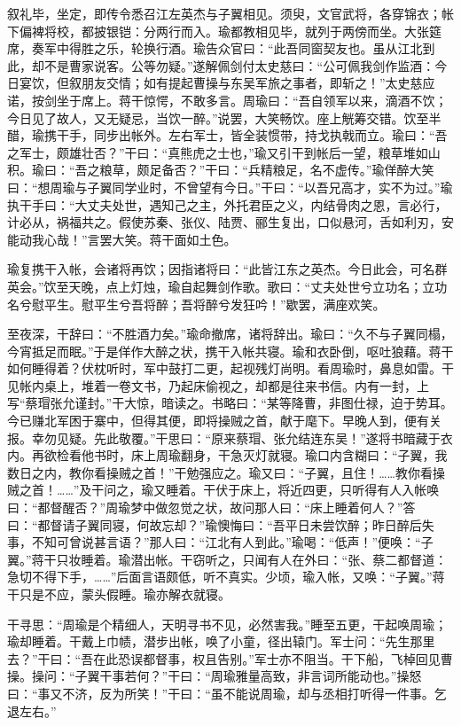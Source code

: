 叙礼毕，坐定，即传令悉召江左英杰与子翼相见。须臾，文官武将，各穿锦衣；帐下偏裨将校，都披银铠：分两行而入。瑜都教相见毕，就列于两傍而坐。大张筵席，奏军中得胜之乐，轮换行酒。瑜告众官曰：“此吾同窗契友也。虽从江北到此，却不是曹家说客。公等勿疑。”遂解佩剑付太史慈曰：“公可佩我剑作监酒：今日宴饮，但叙朋友交情；如有提起曹操与东吴军旅之事者，即斩之！”太史慈应诺，按剑坐于席上。蒋干惊愕，不敢多言。周瑜曰：“吾自领军以来，滴酒不饮；今日见了故人，又无疑忌，当饮一醉。”说罢，大笑畅饮。座上觥筹交错。饮至半醋，瑜携干手，同步出帐外。左右军士，皆全装惯带，持戈执戟而立。瑜曰：“吾之军士，颇雄壮否？”干曰：“真熊虎之士也，”瑜又引干到帐后一望，粮草堆如山积。瑜曰：“吾之粮草，颇足备否？”干曰：“兵精粮足，名不虚传。”瑜佯醉大笑曰：“想周瑜与子翼同学业时，不曾望有今日。”干曰：“以吾兄高才，实不为过。”瑜执干手曰：“大丈夫处世，遇知己之主，外托君臣之义，内结骨肉之恩，言必行，计必从，祸福共之。假使苏秦、张仪、陆贾、郦生复出，口似悬河，舌如利刃，安能动我心哉！”言罢大笑。蒋干面如土色。

瑜复携干入帐，会诸将再饮；因指诸将曰：“此皆江东之英杰。今日此会，可名群英会。”饮至天晚，点上灯烛，瑜自起舞剑作歌。歌曰：“丈夫处世兮立功名；立功名兮慰平生。慰平生兮吾将醉；吾将醉兮发狂吟！”歇罢，满座欢笑。

至夜深，干辞曰：“不胜酒力矣。”瑜命撤席，诸将辞出。瑜曰：“久不与子翼同榻，今宵抵足而眠。”于是佯作大醉之状，携干入帐共寝。瑜和衣卧倒，呕吐狼藉。蒋干如何睡得着？伏枕听时，军中鼓打二更，起视残灯尚明。看周瑜时，鼻息如雷。干见帐内桌上，堆着一卷文书，乃起床偷视之，却都是往来书信。内有一封，上写“蔡瑁张允谨封。”干大惊，暗读之。书略曰：“某等降曹，非图仕禄，迫于势耳。今已赚北军困于寨中，但得其便，即将操贼之首，献于麾下。早晚人到，便有关报。幸勿见疑。先此敬覆。”干思曰：“原来蔡瑁、张允结连东吴！”遂将书暗藏于衣内。再欲检看他书时，床上周瑜翻身，干急灭灯就寝。瑜口内含糊曰：“子翼，我数日之内，教你看操贼之首！”干勉强应之。瑜又曰：“子翼，且住！……教你看操贼之首！……”及干问之，瑜又睡着。干伏于床上，将近四更，只听得有人入帐唤曰：“都督醒否？”周瑜梦中做忽觉之状，故问那人曰：“床上睡着何人？”答曰：“都督请子翼同寝，何故忘却？”瑜懊悔曰：“吾平日未尝饮醉；昨日醉后失事，不知可曾说甚言语？”那人曰：“江北有人到此。”瑜喝：“低声！”便唤：“子翼。”蒋干只妆睡着。瑜潜出帐。干窃听之，只闻有人在外曰：“张、蔡二都督道：急切不得下手，……”后面言语颇低，听不真实。少顷，瑜入帐，又唤：“子翼。”蒋干只是不应，蒙头假睡。瑜亦解衣就寝。

干寻思：“周瑜是个精细人，天明寻书不见，必然害我。”睡至五更，干起唤周瑜；瑜却睡着。干戴上巾帻，潜步出帐，唤了小童，径出辕门。军士问：“先生那里去？”干曰：“吾在此恐误都督事，权且告别。”军士亦不阻当。干下船，飞棹回见曹操。操问：“子翼干事若何？”干曰：“周瑜雅量高致，非言词所能动也。”操怒曰：“事又不济，反为所笑！”干曰：“虽不能说周瑜，却与丞相打听得一件事。乞退左右。”

